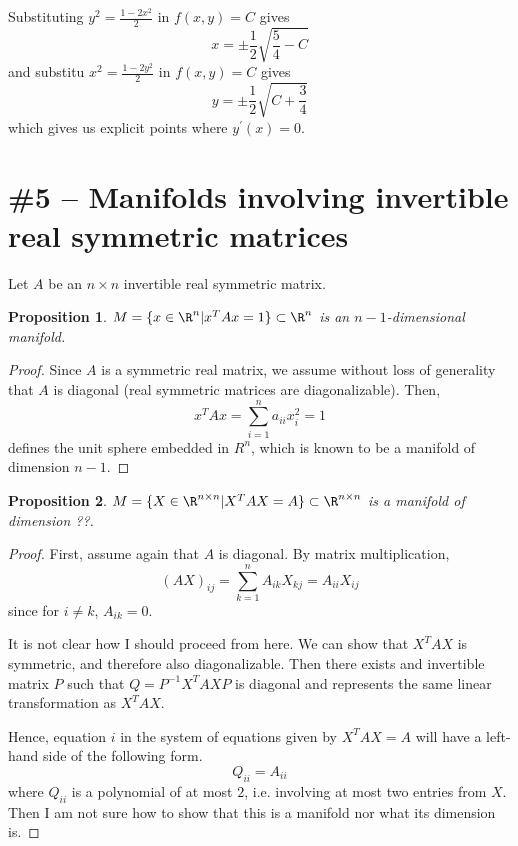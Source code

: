 \documentclass[letterpaper,11pt]{article}
\newtheorem{prop}{Proposition}
\newcommand{\inv}[1]{#1^{-1}}
\begin{document}
Substituting $y^2 = \frac{1 - 2x^2}{2}$ in $f(x, y) = C$ gives
\begin{equation*}
    x = \pm \frac{1}{2} \sqrt{\frac{5}{4} - C}
\end{equation*}
and substitu $x^2 = \frac{1 - 2y^2}{2}$ in $f(x, y) = C$ gives
\begin{equation*}
    y = \pm \frac{1}{2} \sqrt{C + \frac{3}{4}}
\end{equation*}
which gives us explicit points where $y^\prime(x) = 0$.

\section*{\#5 -- Manifolds involving invertible real symmetric matrices}

Let $A$ be an $n \times n$ invertible real symmetric matrix.

\begin{prop}
    $M = \{ x \in \R^n | x^T A x = 1 \} \subset \R^n$ is an $n-1$-dimensional
    manifold.
\end{prop}

\begin{proof}
    Since $A$ is a symmetric real matrix, we assume without loss of generality
    that $A$ is diagonal (real symmetric matrices are diagonalizable).
    Then,
    \begin{equation*}
    x^T A x = \sum_{i=1}^n {a_{ii} x_i^2} = 1
    \end{equation*}
    defines the unit sphere embedded in $R^n$, which is known to be a manifold
    of dimension $n - 1$.
\end{proof}

\begin{prop}
    $M = \{ X \in \R^{n \times n} | X^T A X = A \} \subset \R^{n \times n}$ is
    a manifold of dimension ??.
\end{prop}

\begin{proof}
    First, assume again that $A$ is diagonal.
    By matrix multiplication,
    \begin{equation*}
        (AX)_{ij} = \sum_{k=1}^n {A_{ik} X_{kj}} = A_{ii} X_{ij}
    \end{equation*}
    since for $i \neq k$, $A_{ik} = 0$.

    It is not clear how I should proceed from here. We can show that $X^T A X$
    is symmetric, and therefore also diagonalizable. Then there exists and
    invertible matrix $P$ such that $Q = \inv{P} X^T A X P$ is diagonal and
    represents the same linear transformation as $X^T A X$.

    Hence, equation $i$ in the system of equations given by $X^T A X = A$ will
    have a left-hand side of the following form.
    \begin{equation*}
        Q_{ii} = A_{ii}
    \end{equation*}
    where $Q_{ii}$ is a polynomial of at most $2$, i.e. involving at most two
    entries from $X$. Then I am not sure how to show that this is a manifold
    nor what its dimension is.
\end{proof}
\end{document}

